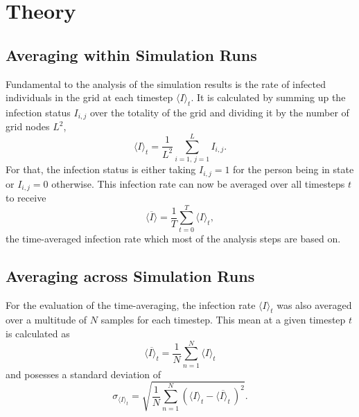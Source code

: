 \section{Theory}

\subsection{Averaging within Simulation Runs}

Fundamental to the analysis of the simulation results is the rate of infected individuals in the grid at each timestep $\langle I\rangle_t$. It is calculated by summing up the infection status $I_{i,j}$
over the totality of the grid and dividing it by the number of grid nodes $L^2$,
\begin{equation}
    \langle I\rangle_t=\frac{1}{L^2}\sum_{i=1,\,j=1}^{L}I_{i,j}.
    \label{eq:theo_inf_rate}
\end{equation}
For that, the infection status is either taking $I_{i,j}=1$ for the person being in state \infected{} or $I_{i,j}=0$ otherwise. This infection rate can now be averaged over all timesteps $t$ to receive
\begin{equation}
    \overline{\langle I\rangle}=\frac{1}{T}\sum_{t=0}^{T}\langle I\rangle_t,
    \label{eq:theo_time_avg_inf_rate}
\end{equation}
the time-averaged infection rate which most of the analysis steps are based on.

\subsection{Averaging across Simulation Runs}

For the evaluation of the time-averaging, the infection rate $\langle I\rangle_t$ was also averaged over a multitude of $N$ samples for each timestep. This mean at a given timestep $t$ is calculated as
\begin{equation}
    \overline{\langle I\rangle_t}=\frac{1}{N}\sum_{n=1}^{N}\langle I\rangle_t
    \label{eq:theo_mean_inf_rate}
\end{equation}
and posesses a standard deviation of
\begin{equation}
    \sigma_{\langle I\rangle_t}=\sqrt{\frac{1}{N}\sum_{n=1}^{N}\left(\langle I\rangle_t-\overline{\langle I\rangle_t}\,\right)^2}.
    \label{eq:theo_sigma_inf_rate}
\end{equation}